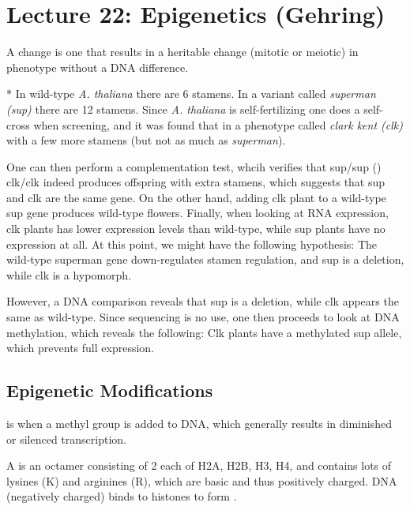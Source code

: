 \section*{Lecture 22: Epigenetics (Gehring)}
\setcounter{section}{22}

\begin{defn}
	A  change is one that results in a heritable change (mitotic or meiotic) in phenotype without a DNA difference.
\end{defn}

\begin{exper}*
	In wild-type \emph{A. thaliana} there are 6 stamens. 
	In a variant called \emph{superman (sup)} there are 12 stamens. Since \emph{A. thaliana} is self-fertilizing one does a self-cross when screening, 
	and it was found that in a phenotype called \emph{clark kent (clk)} with a few more stamens (but not as much as \emph{superman}).

	One can then perform a complementation test, whcih verifies that sup/sup (\x) clk/clk indeed produces offspring with extra stamens, which suggests that sup and clk are the same gene.
	On the other hand, adding clk plant to a wild-type sup gene produces wild-type flowers.
	Finally, when looking at RNA expression, clk plants has lower expression levels than wild-type, while sup plants have no expression at all.
	At this point, we might have the following hypothesis: The wild-type superman gene down-regulates stamen regulation, and sup is a deletion, while clk is a hypomorph.

	However, a DNA comparison reveals that sup is a deletion, while clk appears the same as wild-type.
	Since sequencing is no use, one then proceeds to look at DNA methylation, which reveals the following: Clk plants have a methylated sup allele, which prevents full expression.
\end{exper}

\subsection{Epigenetic Modifications}

\begin{defn}
	 is when a methyl group is added to DNA, which generally results in diminished or silenced transcription.
\end{defn}

\begin{defn}
	A  is an octamer consisting of 2 each of H2A, H2B, H3, H4, and contains lots of lysines (K) and arginines (R), which are basic and thus positively charged. DNA (negatively charged) binds to histones to form .
\end{defn}

